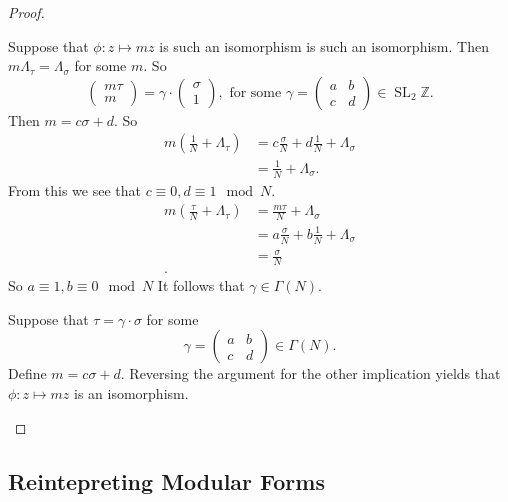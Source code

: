 \documentclass[a4paper]{article}
\theoremstyle{theoremdd}
\theoremstyle{definitiondd}
\theoremstyle{remarkdd}
\newcommand{\Z}{\mathbb{Z}}
\newcommand{\ltr}{\par \noindent \framebox[1\width]{ $\implies$ } \hspace{.2cm}}
\newcommand{\rtl}{\par \noindent \framebox[1\width]{ $\impliedby$ } \hspace{.2cm} }
\DeclareMathOperator{\SL}{SL}
\begin{document}
\begin{proof}
\begin{enumerate}
	\ltr Suppose that $\phi: z\mapsto  m z$ is such an isomorphism is such an isomorphism.
	Then $m \Lambda_\tau = \Lambda_\sigma$ for some $m$. So \[
	\begin{pmatrix} m \tau \\ m \end{pmatrix} = 
	\gamma \cdot  \begin{pmatrix} \sigma \\ 1 \end{pmatrix} , 
	\text{ for some } \gamma = \begin{pmatrix} a & b \\ c & d \end{pmatrix} \in \SL_2 \Z
	.\] 
	Then $m = c \sigma + d$. So 
	 \begin{align*}
		 m \left( \frac{1}{N} + \Lambda_\tau \right)  &= c \frac{\sigma}{N} + d \frac{1}{N} + \Lambda_\sigma \\
		 &=  \frac{1}{N} + \Lambda_\sigma
	.\end{align*}
	From this we see that $c \equiv 0, d \equiv 1 \mod N$. 
	\begin{align*}
		m(\frac{\tau}{N} + \Lambda_\tau) &= \frac{m\tau}{N} + \Lambda_\sigma \\
		&= a \frac{\sigma}{N} + b \frac{1}{N} + \Lambda_\sigma \\
		&= \frac{\sigma}{N} \\
	.\end{align*}
	So $a \equiv 1, b \equiv 0 \mod N$
	It follows that $\gamma  \in \Gamma(N)$. 

	\rtl Suppose that $\tau = \gamma \cdot \sigma$ for some \[
		\gamma = \begin{pmatrix} a & b \\ c & d  \end{pmatrix} \in \Gamma(N)
	.\] 	
	Define $m = c \sigma + d$. Reversing the argument for the other implication yields that $\phi:z \mapsto m z$ is an isomorphism.
	\end{enumerate}
\end{proof}

\subsection{Reintepreting Modular Forms} \label{sec:reintepreting_modular_forms}
\end{document}
